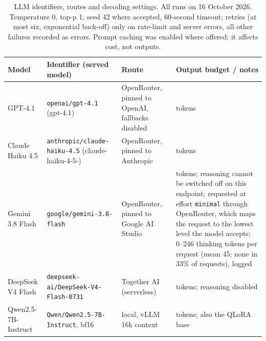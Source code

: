 \documentclass[preprint,12pt,authoryear]{elsarticle}
\newif\ifrevmarkup
\newcommand{\revblock}{\ifrevmarkup\color{blue}\fi}
\begin{document}
\begin{table}[!ht]
\revblock
\centering
\caption{LLM identifiers, routes and decoding settings. All runs on 16 October 2026. Temperature 0, top-p 1, seed 42 where accepted, 60-second timeout; retries (at most six, exponential back-off) only on rate-limit and server errors, all other failures recorded as errors. Prompt caching was enabled where offered; it affects cost, not outputs.}
\label{tab:llm_snapshots}
\small
\begin{tabularx}{\textwidth}{@{}>{\raggedright\arraybackslash}p{2.0cm} >{\raggedright\arraybackslash}p{4.1cm} >{\raggedright\arraybackslash}p{2.6cm} >{\raggedright\arraybackslash}X@{}}
\toprule
\textbf{Model} & \textbf{Identifier (served model)} & \textbf{Route} & \textbf{Output budget / notes} \\
\midrule
GPT-4.1 & \texttt{openai/gpt-4.1} (gpt-4.1) & OpenRouter, pinned to OpenAI, fallbacks disabled & 16 tokens \\
Claude Haiku 4.5 & \texttt{anthropic/\allowbreak claude-haiku-4.5} (claude-haiku-4-5-\allowbreak 20251001) & OpenRouter, pinned to Anthropic & 16 tokens \\
Gemini 3.8 Flash & \texttt{google/\allowbreak gemini-3.8-flash} & OpenRouter, pinned to Google AI Studio & 256 tokens; reasoning cannot be switched off on this endpoint; requested at effort \texttt{minimal} through OpenRouter, which maps the request to the lowest level the model accepts; 0--246 thinking tokens per request (mean 45; none in 33\% of requests), logged \\
DeepSeek V4 Flash & \texttt{deepseek-ai/\allowbreak DeepSeek-V4-\allowbreak Flash-0731} & Together AI (serverless) & 16 tokens; reasoning disabled \\
Qwen2.5-7B-Instruct & \texttt{Qwen/\allowbreak Qwen2.5-7B-Instruct}, bf16 & local, vLLM 16k context & 16 tokens; also the QLoRA base \\
\bottomrule
\end{tabularx}
\end{table}
\end{document}
